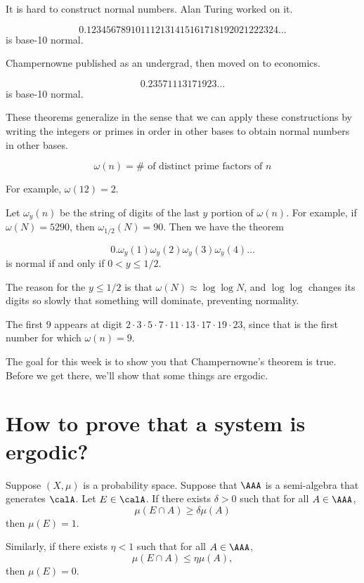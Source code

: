 \documentclass{article}
\begin{document}
It is hard to construct normal numbers. Alan Turing worked on it.
\begin{theorem}[Champernowne, 1922]
    \[ 0.123456789101112131415161718192021222324\ldots \]
    is base-10 normal.
\end{theorem}
Champernowne published as an undergrad, then moved on to economics.

\begin{theorem}
    \[0.23571113171923\ldots \]
    is base-10 normal.
\end{theorem}

These theorems generalize in the sense that we can apply these 
constructions by writing the integers or primes in order 
in other bases to obtain normal numbers in other bases.

\begin{definition}
\[ \omega(n)=\#\text{ of distinct prime factors of $n$}\]
\end{definition}

For example, $\omega(12)=2$.

Let $\omega_y(n)$ be the string of digits of the last $y$
portion of $\omega(n)$.
For example, if $\omega(N) = 5290$, then $\omega_{1/2}(N) = 90$.
Then we have the theorem
\begin{theorem}[Vandehey]
    \[0.\omega_y(1)\omega_y(2)\omega_y(3)\omega_y(4)\ldots \]
    is normal if and only if $0<y\le 1/2$.
\end{theorem}

The reason for the $y \le 1/2$ is that $\omega(N)\approx \log\log N$,
and $\log\log$ changes its digits so slowly that something 
will dominate, preventing normality.

The first $9$ appears at digit $2\cdot 3 \cdot 5\cdot 7 \cdot 11 
\cdot 13\cdot 17\cdot 19 \cdot 23$, since that is 
the first number for which $\omega(n) = 9$.

The goal for this week is to show you that Champernowne's theorem 
is true. Before we get there, we'll show that some things are 
ergodic.

\section{How to prove that a system is ergodic?}

\begin{lemma}
    Suppose $(X,\mu)$ is a probability space. Suppose that 
    $\AAA$ is a semi-algebra that generates $\calA$. 
    Let $E\in \calA$. If there 
    exists $\delta > 0$ such that for all $A\in\AAA$,
    \[\mu(E\cap A) \ge \delta \mu(A)\]
    then $\mu(E)=1$.

    Similarly, if there exists $\eta < 1$ such that for all 
    $A\in \AAA$, \[ \mu(E\cap A) \le \eta \mu(A),\] then 
    $\mu(E)=0$.
\end{lemma}
\end{document}
